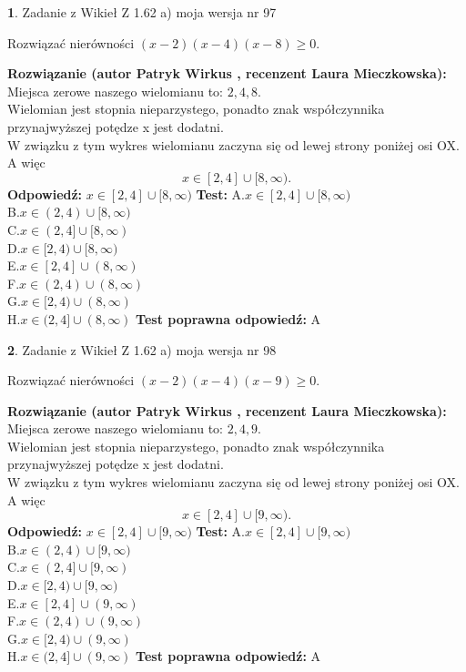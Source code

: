 \documentclass[12pt, a4paper]{article}
\theoremstyle{definition} %
\newtheorem{zad}{}
\newcommand{\zadStart}[1]{\begin{zad}#1\newline}
\newcommand{\zadStop}{\end{zad}}
\newcommand{\rozwStart}[2]{\noindent \textbf{Rozwiązanie (autor #1 , recenzent #2): }\newline}
\newcommand{\rozwStop}{\newline}
\newcommand{\odpStart}{\noindent \textbf{Odpowiedź:}\newline}
\newcommand{\odpStop}{\newline}
\newcommand{\testStart}{\noindent \textbf{Test:}\newline}
\newcommand{\testStop}{\newline}
\newcommand{\kluczStart}{\noindent \textbf{Test poprawna odpowiedź:}\newline}
\newcommand{\kluczStop}{\newline}
\begin{document}
\zadStart{Zadanie z Wikieł Z 1.62 a) moja wersja nr 97}

Rozwiązać nierówności $(x-2)(x-4)(x-8)\ge0$.
\zadStop
\rozwStart{Patryk Wirkus}{Laura Mieczkowska}
Miejsca zerowe naszego wielomianu to: $2, 4, 8$.\\
Wielomian jest stopnia nieparzystego, ponadto znak współczynnika przy\linebreak najwyższej potędze x jest dodatni.\\ W związku z tym wykres wielomianu zaczyna się od lewej strony poniżej osi OX. A więc $$x \in [2,4] \cup [8,\infty).$$
\rozwStop
\odpStart
$x \in [2,4] \cup [8,\infty)$
\odpStop
\testStart
A.$x \in [2,4] \cup [8,\infty)$\\
B.$x \in (2,4) \cup [8,\infty)$\\
C.$x \in (2,4] \cup [8,\infty)$\\
D.$x \in [2,4) \cup [8,\infty)$\\
E.$x \in [2,4] \cup (8,\infty)$\\
F.$x \in (2,4) \cup (8,\infty)$\\
G.$x \in [2,4) \cup (8,\infty)$\\
H.$x \in (2,4] \cup (8,\infty)$
\testStop
\kluczStart
A
\kluczStop



\zadStart{Zadanie z Wikieł Z 1.62 a) moja wersja nr 98}

Rozwiązać nierówności $(x-2)(x-4)(x-9)\ge0$.
\zadStop
\rozwStart{Patryk Wirkus}{Laura Mieczkowska}
Miejsca zerowe naszego wielomianu to: $2, 4, 9$.\\
Wielomian jest stopnia nieparzystego, ponadto znak współczynnika przy\linebreak najwyższej potędze x jest dodatni.\\ W związku z tym wykres wielomianu zaczyna się od lewej strony poniżej osi OX. A więc $$x \in [2,4] \cup [9,\infty).$$
\rozwStop
\odpStart
$x \in [2,4] \cup [9,\infty)$
\odpStop
\testStart
A.$x \in [2,4] \cup [9,\infty)$\\
B.$x \in (2,4) \cup [9,\infty)$\\
C.$x \in (2,4] \cup [9,\infty)$\\
D.$x \in [2,4) \cup [9,\infty)$\\
E.$x \in [2,4] \cup (9,\infty)$\\
F.$x \in (2,4) \cup (9,\infty)$\\
G.$x \in [2,4) \cup (9,\infty)$\\
H.$x \in (2,4] \cup (9,\infty)$
\testStop
\kluczStart
A
\kluczStop
\end{document}
